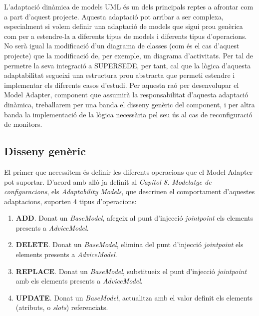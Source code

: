 L'adaptació dinàmica de models UML és un dels principals reptes a afrontar com a part d'aquest projecte. Aquesta adaptació pot arribar a ser complexa, especialment si volem definir una adaptació de models que sigui prou genèrica com per a estendre-la a diferents tipus de models i diferents tipus d'operacions. No serà igual la modificació d'un diagrama de classes (com és el cas d'aquest projecte) que la modificació de, per exemple, un diagrama d'activitats. Per tal de permetre la seva integració a SUPERSEDE, per tant, cal que la lògica d'aquesta adaptabilitat segueixi una estructura prou abstracta que permeti estendre i implementar els diferents casos d'estudi. Per aquesta raó per desenvolupar el Model Adapter, component que assumirà la responsabilitat d'aquesta adaptació dinàmica, treballarem per una banda el disseny genèric del component, i per altra banda la implementació de la lògica necessària pel seu ús al cas de reconfiguració de monitors.\\

\subsection{Disseny genèric}

El primer que necessitem és definir les diferents operacions que el Model Adapter pot suportar. D'acord amb allò ja definit al \textit{Capítol 8. Modelatge de configuracions}, els \textit{Adaptability Models}, que descriuen el comportament d'aquestes adaptacions, suporten 4 tipus d'operacions: 

\begin{enumerate}
\item \textbf{ADD}. Donat un \textit{BaseModel}, afegeix al punt d'injecció \textit{jointpoint} els elements presents a \textit{AdviceModel}.
\item \textbf{DELETE}. Donat un \textit{BaseModel}, elimina del punt d'injecció \textit{jointpoint} els elements presents a \textit{AdviceModel}.
\item \textbf{REPLACE}. Donat un \textit{BaseModel}, substitueix el punt d'injecció \textit{jointpoint} amb els elements presents a \textit{AdviceModel}.
\item \textbf{UPDATE}. Donat un \textit{BaseModel}, actualitza amb el valor definit els elements (atributs, o \textit{slots}) referenciats.
\end{enumerate}

